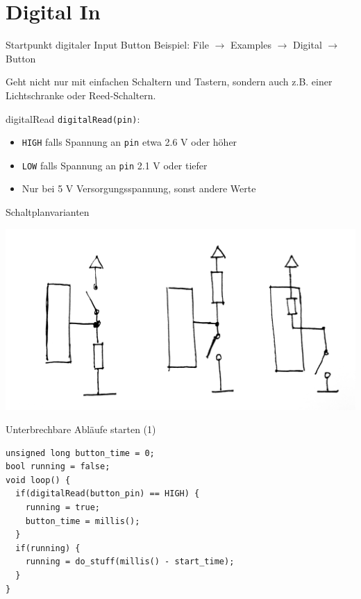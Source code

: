 \documentclass[bigger]{beamer}
\begin{document}
\section{Digital In}
\label{sec:org7687263}
\begin{frame}[label={sec:org0cf5a7e}]{Startpunkt digitaler Input}
Button Beispiel: File \(\rightarrow\) Examples \(\rightarrow\) Digital
\(\rightarrow\) Button

Geht nicht nur mit einfachen Schaltern und Tastern, sondern auch
z.B. einer Lichtschranke oder Reed-Schaltern.
\end{frame}

\begin{frame}[fragile,label={sec:org3864f57}]{digitalRead}
 \texttt{digitalRead(pin)}: 
\begin{itemize}
\item \texttt{HIGH} falls Spannung an \texttt{pin} etwa 2.6 V oder höher
\item \texttt{LOW} falls Spannung an \texttt{pin} 2.1 V oder tiefer
\item Nur bei 5 V Versorgungsspannung, sonst andere Werte
\end{itemize}
\end{frame}

\begin{frame}[label={sec:orgae61e90}]{Schaltplanvarianten}
\begin{center}
\includegraphics[width=.9\linewidth]{./img/pullup.jpg}
\end{center}
\end{frame}

\begin{frame}[fragile,label={sec:org469795e}]{Unterbrechbare Abläufe starten (1)}
 \begin{verbatim}
unsigned long button_time = 0;
bool running = false;
void loop() {
  if(digitalRead(button_pin) == HIGH) {
    running = true;
    button_time = millis();
  }
  if(running) {
    running = do_stuff(millis() - start_time);
  }
}
\end{verbatim}
\end{frame}
\end{document}
